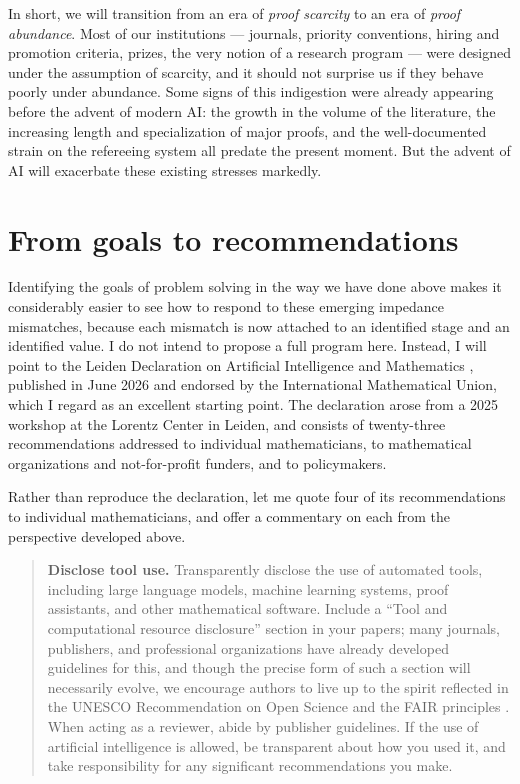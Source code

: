 \documentclass[12pt]{amsart}
\theoremstyle{definition}
\begin{document}
In short, we will transition from an era of \emph{proof scarcity} to an era of \emph{proof abundance}.  Most of our institutions --- journals, priority conventions, hiring and promotion criteria, prizes, the very notion of a research program --- were designed under the assumption of scarcity, and it should not surprise us if they behave poorly under abundance.  Some signs of this indigestion were already appearing before the advent of modern AI: the growth in the volume of the literature, the increasing length and specialization of major proofs, and the well-documented strain on the refereeing system all predate the present moment.  But the advent of AI will exacerbate these existing stresses markedly.

\section{From goals to recommendations}

Identifying the goals of problem solving in the way we have done above makes it considerably easier to see how to respond to these emerging impedance mismatches, because each mismatch is now attached to an identified stage and an identified value.  I do not intend to propose a full program here.  Instead, I will point to the Leiden Declaration on Artificial Intelligence and Mathematics \cite{leiden}, published in June 2026 and endorsed by the International Mathematical Union, which I regard as an excellent starting point.  The declaration arose from a 2025 workshop at the Lorentz Center in Leiden, and consists of twenty-three recommendations addressed to individual mathematicians, to mathematical organizations and not-for-profit funders, and to policymakers.  

Rather than reproduce the declaration, let me quote four of its recommendations to individual mathematicians, and offer a commentary on each from the perspective developed above.

\medskip

\begin{quote}
\textbf{Disclose tool use.} Transparently disclose the use of automated tools, including large language models, machine learning systems, proof assistants, and other mathematical software. Include a ``Tool and computational resource disclosure'' section in your papers; many journals, publishers, and professional organizations have already developed guidelines for this, and though the precise form of such a section will necessarily evolve, we encourage authors to live up to the spirit reflected in the UNESCO Recommendation on Open Science \cite{UNESCOOpenScience} and the FAIR principles \cite{WilkinsonEtAlFAIR}. When acting as a reviewer, abide by publisher guidelines. If the use of artificial intelligence is allowed, be transparent about how you used it, and take responsibility for any significant recommendations you make.
\end{quote}
\end{document}
